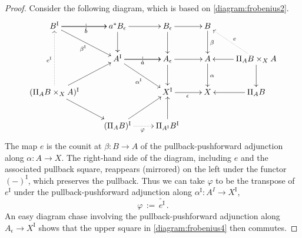 \documentclass[12pt]{article}
\newcommand{\ra}{\ensuremath{\rightarrow}}
\newcommand{\I}{\ensuremath{\mathrm{I}}}
\theoremstyle{remark}
\theoremstyle{definition}
\begin{document}
\begin{proof}
Consider the following diagram, which is based on \eqref{diagram:frobenius2}.
\begin{equation}\label{diagram:frobenius7}
\xymatrix{
B^\I \ar[r]|| \ar[r]_{b} \ar[rd]_{\beta^\I}  & a^*B_\epsilon \ar[r]  \ar[d]  & B_{\epsilon}  \ar[d]   \ar[r] & B \ar[d]^\beta & \\
& A^\I \ar[r]|| \ar[r]_{a}  \ar[rd]_{\alpha^\I}  & A_{\epsilon} \ar[d]   \ar[r] & A \ar[d]^\alpha &  \ar[d] \ar[l] \ar@{..>}[lu]_{e}\Pi_AB\times_{X} A\\
 (\Pi_AB \times_{X} A)^\I \ar@{..>}[uu]^{e^\I} \ar[ru] \ar[rd] && X^\I \ar[r]_{\epsilon} &  X &   \Pi_AB \ar[l]\\
& (\Pi_AB)^\I \ar[ru] \ar@{..>}[r]_\varphi  & \Pi_{A^\I}B^\I   \ar[u] & &
}
\end{equation}
The map $e$ is the counit at $\beta: B\ra A$ of the pullback-pushforward adjunction along $\alpha: A\ra X$. The right-hand side of the diagram, including $e$ and the associated pullback square, reappears (mirrored) on the left under the functor $(-)^\I$, which preserves the pullback. Thus we can take $\varphi$ to be the transpose of $e^\I$ under the pullback-pushforward adjunction along $\alpha^\I: A^I\ra X^\I$,
\[
\varphi\, :=\, \widetilde{e^\I}\,.
\]
An easy diagram chase involving the pullback-pushforward adjunction along $A_\epsilon\ra X^\I$ shows that the upper square in \eqref{diagram:frobenius4} then commutes.

%
\smallskip


\end{proof}
\end{document}
